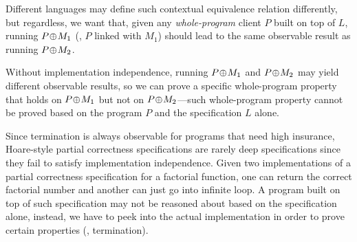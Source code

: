 \noindent{}Different languages may define such contextual equivalence relation
differently, but regardless, we want that, given any {\em
  whole-program} client $P$ built on top of $L$, running
$P\!\oplus\! M_1$ (\ie, $P$ linked with $M_1$) should lead to the same
observable result as running $P\!\oplus\! M_2$.

Without implementation independence, running $P\!\oplus\! M_1$ and
$P\!\oplus\! M_2$ may yield different observable results, so we can prove
a specific whole-program property that holds on $P\!\oplus\! M_1$ but not on
$P\!\oplus\! M_2$---such whole-program property cannot be proved based
on the program $P$ and the specification $L$ alone. 

Since termination is always observable 
for programs that need high insurance,
Hoare-style partial correctness specifications are rarely
deep specifications since they fail to satisfy implementation
independence. Given two implementations of a partial correctness
specification for a factorial function, one can return the correct
factorial number and another can just go into infinite loop.  A
program built on top of such specification may not be reasoned about 
based on the specification alone, instead, we have to peek into the actual
implementation in order to prove certain properties (\eg,
termination).

